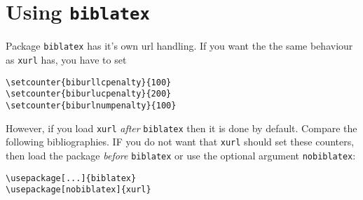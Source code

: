 \noindent
{}

\section{Using \texttt{biblatex}}
Package \texttt{biblatex} has it's own url handling. If you want the the same behaviour as \texttt{xurl} has, you have to
set 

\begin{verbatim}
\setcounter{biburllcpenalty}{100}
\setcounter{biburlucpenalty}{200}
\setcounter{biburlnumpenalty}{100}
\end{verbatim}

However, if you load \texttt{xurl} \emph{after} \texttt{biblatex} then it is done
by default. Compare the following bibliographies. IF you do not want that \texttt{xurl}
should set these counters, then load the package \emph{before} \texttt{biblatex} or
use the optional argument \texttt{nobiblatex}:

\begin{verbatim}
\usepackage[...]{biblatex}
\usepackage[nobiblatex]{xurl}
\end{verbatim}

\nocite{*}


\printbibliography[title={With urlbreaks}]

\setcounter{biburllcpenalty}{0}
\setcounter{biburlucpenalty}{0}
\setcounter{biburlnumpenalty}{0}

\printbibliography[title={xurl with option nobiblatex}]









